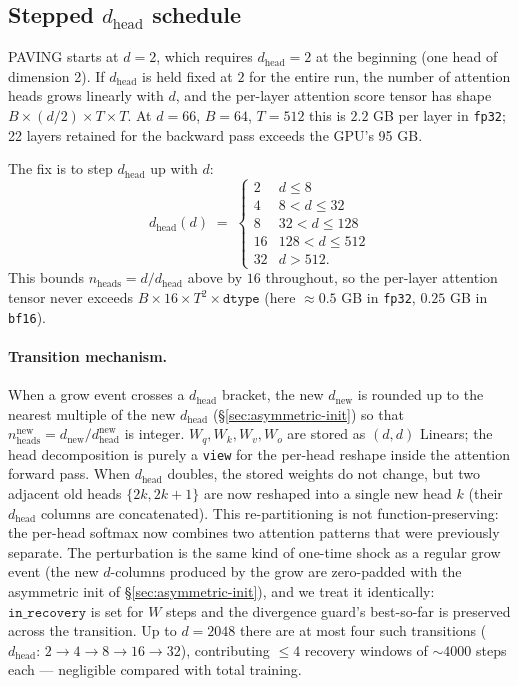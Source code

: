 \documentclass{article}
\begin{document}
\subsection{Stepped $d_{\text{head}}$ schedule}
\label{sec:dhead}

PAVING starts at $d=2$, which requires $d_{\text{head}}=2$ at the
beginning (one head of dimension 2).  If $d_{\text{head}}$ is held
fixed at $2$ for the entire run, the number of attention heads grows
linearly with $d$, and the per-layer attention score tensor has shape
$B \times (d/2) \times T \times T$.  At $d=66$, $B=64$, $T=512$ this is
$2.2$ GB per layer in \texttt{fp32}; 22 layers retained for the
backward pass exceeds the GPU's 95 GB.

The fix is to step $d_{\text{head}}$ up with $d$:
\begin{equation}
d_{\text{head}}(d) \;=\;
\begin{cases}
2  & d \le 8 \\
4  & 8 < d \le 32 \\
8  & 32 < d \le 128 \\
16 & 128 < d \le 512 \\
32 & d > 512.
\end{cases}
\end{equation}
This bounds $n_{\text{heads}} = d / d_{\text{head}}$ above by $16$
throughout, so the per-layer attention tensor never exceeds
$B \times 16 \times T^2 \times \texttt{dtype}$ (here
$\approx 0.5$ GB in \texttt{fp32}, $0.25$ GB in \texttt{bf16}).

\paragraph{Transition mechanism.}  When a grow event crosses a
$d_{\text{head}}$ bracket, the new $d_{\text{new}}$ is rounded up to
the nearest multiple of the new $d_{\text{head}}$
(\S\ref{sec:asymmetric-init}) so that
$n_{\text{heads}}^{\text{new}} = d_{\text{new}} /
d_{\text{head}}^{\text{new}}$ is integer.  $W_q, W_k, W_v, W_o$ are
stored as $(d, d)$ Linears; the head decomposition is purely a
\texttt{view} for the per-head reshape inside the attention forward
pass.  When $d_{\text{head}}$ doubles, the stored weights do not
change, but two adjacent old heads $\{2k, 2k+1\}$ are now reshaped
into a single new head $k$ (their $d_{\text{head}}$ columns are
concatenated).  This re-partitioning is not function-preserving:
the per-head softmax now combines two attention patterns that were
previously separate.  The perturbation is the same kind of one-time
shock as a regular grow event (the new $d$-columns produced by the
grow are zero-padded with the asymmetric init of
\S\ref{sec:asymmetric-init}), and we treat it identically:
$\texttt{in\_recovery}$ is set for $W$ steps and the divergence
guard's best-so-far is preserved across the transition.  Up to
$d{=}2048$ there are at most four such transitions
($d_{\text{head}}{:}\,2{\to}4{\to}8{\to}16{\to}32$), contributing
$\le 4$ recovery windows of $\sim 4000$ steps each --- negligible
compared with total training.
\end{document}
